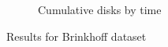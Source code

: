 \begin{figure}
\begin{subfigure}[t]{0.48\textwidth}
        \caption{Cumulative disks by time}
        \label{fig:brinkhoff_disks}
    \end{subfigure}
    \caption{Results for Brinkhoff dataset}
    \label{fig:brinkhoff_results}
\end{figure}
